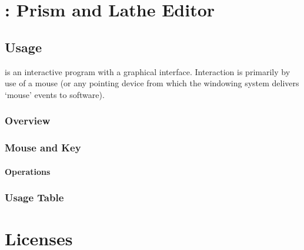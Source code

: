 \documentclass[11pt,onecolumn,letterpaper]{report}%
\begin{document}
\pagestyle{headings}


%
\chapter{\dtypkgu{}: Prism and Lathe Editor}

\section{Usage}%

\IXpkgu{} is an interactive program with a
graphical interface. Interaction is primarily by use of a mouse
(or any pointing device from which the windowing system delivers
`mouse' events to software).


\subsection{Overview}%
\subsection{Mouse and Key}%
\subsubsection{Operations}%
\subsection{Usage Table}%


\chapter{Licenses}%




\ifMKhtml
	\clearpage
\else
	\cleardoublepage
\fi
\printindex
\end{document}
